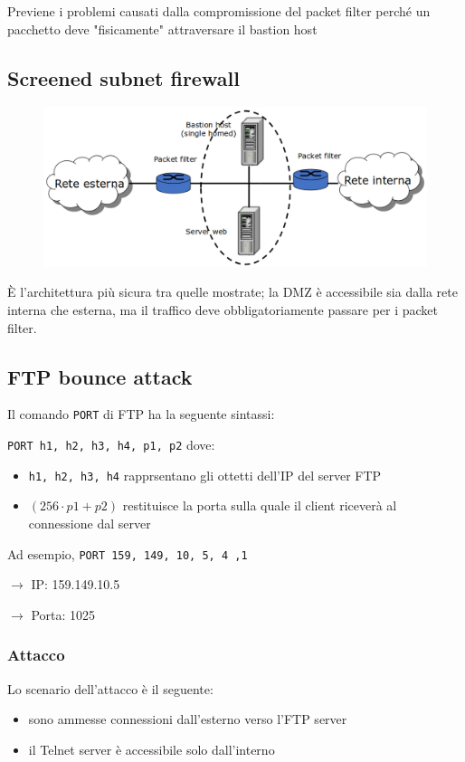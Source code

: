 \noindent Previene i problemi causati dalla compromissione del packet filter 
perché un pacchetto deve "fisicamente" attraversare il bastion host

\subsection{Screened subnet firewall}

\begin{figure}[H]
    \centering
    \includegraphics[width=1\linewidth]{chapters/12/images/subnet-firewall.png}
\end{figure}

È l'architettura più sicura tra quelle mostrate; la DMZ è accessibile 
sia dalla rete interna che esterna, ma il traffico deve obbligatoriamente 
passare per i packet filter.

\subsection{FTP bounce attack}
Il comando \texttt{PORT} di FTP ha la seguente sintassi:
\begin{center}
    \texttt{PORT h1, h2, h3, h4, p1, p2} dove:
    \begin{itemize}
        \item \texttt{h1, h2, h3, h4} rapprsentano gli ottetti dell'IP del server FTP 
        \item $(256 \cdot p1 + p2)$ restituisce la porta sulla quale il client riceverà al connessione dal server
    \end{itemize}
\end{center}

\noindent Ad esempio, \texttt{PORT 159, 149, 10, 5, 4 ,1}

$\rightarrow$ IP: 159.149.10.5

$\rightarrow$ Porta: 1025

\subsubsection{Attacco}
\noindent Lo scenario dell'attacco è il seguente:
\begin{itemize}
    \item sono ammesse connessioni dall'esterno verso l'FTP server 
    \item il Telnet server è accessibile solo dall'interno
\end{itemize}

